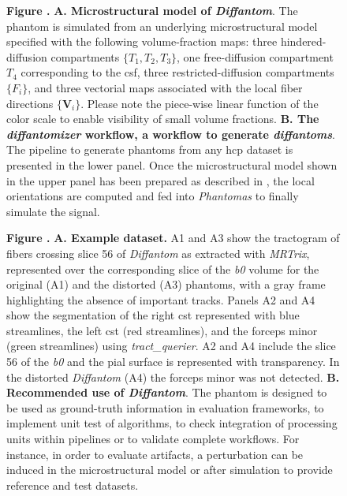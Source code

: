 \documentclass[english]{frontiers/frontiersSCNS} %
\newcommand{\lowb}{\textit{b0}}
\begin{document}
\begin{figure}[h!]
\begin{center}

\end{center}
\textbf{\label{fig:figure1} Figure . }{%
\textbf{A. Microstructural model of \emph{Diffantom}}.
The phantom is simulated from an underlying microstructural model specified with the
  following volume-fraction maps: three hindered-diffusion compartments $\{T_1, T_2, T_3\}$,
  one free-diffusion compartment $T_4$ corresponding to the \gls*{csf},
  three restricted-diffusion compartments $\{F_i\}$, and three vectorial maps
  associated with the local fiber directions $\{\mathbf{V}_i\}$.
Please note the piece-wise linear function of the color scale to enable visibility of small volume fractions.
\textbf{B. The \emph{diffantomizer} workflow, a workflow to generate \emph{diffantoms}}.
The pipeline to generate phantoms from any \gls*{hcp} dataset is presented in the lower panel.
Once the microstructural model shown in the upper panel has been prepared as described in ,
  the local orientations are computed and fed into \emph{Phantomas} to finally simulate the signal.
}
\end{figure}

\begin{figure}[h!]
\begin{center}

\end{center}
\textbf{\label{fig:figure2} Figure . }{%
\textbf{A. Example dataset.}
A1 and A3 show the tractogram of fibers crossing slice 56 of \emph{Diffantom} as
  extracted with \emph{MRTrix}, represented over the corresponding slice of the
  \lowb{} volume for the original (A1) and the distorted (A3) phantoms, with a gray
  frame highlighting the absence of important tracks.
Panels A2 and A4 show the segmentation of the right \gls*{cst} represented with blue
  streamlines, the left \gls*{cst} (red streamlines), and the forceps minor (green streamlines)
  using \emph{tract\_querier}.
A2 and A4 include the slice 56 of the \lowb{} and the pial surface is represented
  with transparency.
In the distorted \emph{Diffantom} (A4) the forceps minor was not detected.
\textbf{B. Recommended use of \emph{Diffantom}}.
The phantom is designed to be used as ground-truth information in evaluation frameworks,
  to implement unit test of algorithms, to check integration of processing units within
  pipelines or to validate complete workflows.
For instance, in order to evaluate artifacts, a perturbation can be induced in the microstructural
  model or after simulation to provide reference and test datasets.
}
\end{figure}
\end{document}
